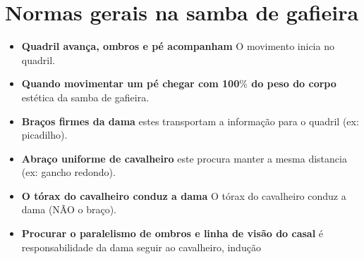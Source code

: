 \section{Normas gerais na samba de gafieira}


\begin{itemize}
\item \textbf{Quadril avança, ombros e pé acompanham}  O movimento inicia no quadril.
\item \textbf{Quando movimentar um pé chegar com 100$\%$ do peso do corpo} estética da samba de gafieira.
\item \textbf{Braços firmes da dama} estes transportam a informação para o quadril (ex: picadilho).
\item \textbf{Abraço uniforme de cavalheiro} este procura manter a mesma distancia (ex: gancho redondo).
\item \textbf{O tórax do cavalheiro conduz a dama} O tórax do cavalheiro conduz a dama (NÃO o braço).
\item \textbf{Procurar o paralelismo de ombros e linha de visão do casal} é responsabilidade da dama seguir ao cavalheiro, indução

\end{itemize}
